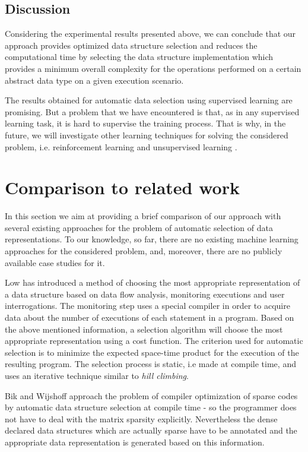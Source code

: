 \subsection{Discussion}

Considering the experimental results presented above, we can conclude that our approach provides optimized data structure selection and reduces the computational time by selecting the data structure implementation which provides a minimum overall complexity for the operations performed on a certain abstract data type on a given execution scenario.

The results obtained for automatic data selection using supervised learning are promising. But a problem that we have encountered is that, as in any supervised learning task, it is hard to supervise the training process. That is why, in the future, we will investigate other learning techniques for solving the considered problem, i.e. reinforcement learning \cite{sutton} and unsupervised learning \cite{mitchell}.

\section{Comparison to related work}\label{cmp}

In this section we aim at providing a brief comparison of our approach with several existing approaches for the problem of automatic selection of data representations. To our knowledge, so far, there are no existing machine learning approaches for the considered problem, and, moreover, there are no publicly available case studies for it.

Low  \cite{Low} has introduced  a method of choosing the most appropriate representation of a data structure based on data flow analysis, monitoring executions and user interrogations. The monitoring step uses a special compiler in order to acquire data about the number of executions of each statement in a program. Based on the above mentioned information, a selection algorithm will choose the most appropriate representation using a cost function. The criterion used for automatic selection is to minimize the expected space-time product for the execution of the resulting program. The selection process is static, i.e made at compile time, and uses an iterative technique similar to \emph{hill climbing}.

Bik and Wijshoff  \cite{29,30} approach the problem of compiler optimization of sparse codes by automatic data structure selection at compile time - so the programmer does not have to deal with the matrix sparsity explicitly. Nevertheless the dense declared data structures which are actually sparse have to be annotated and the appropriate data representation is generated based on this information.

